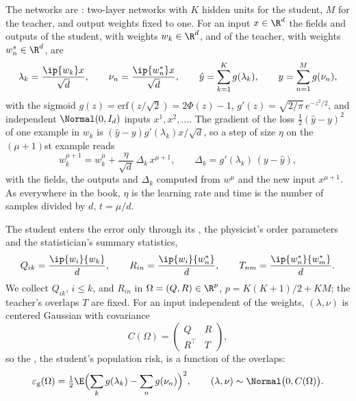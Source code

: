 \begin{refsection}
The networks are : two-layer networks with $K$ hidden units for the student, $M$ for the teacher, and output weights fixed to one. For an input $x\in\R^d$ the fields and outputs of the student, with weights $w_k\in\R^d$, and of the teacher, with weights $w^*_n\in\R^d$, are
\[
\lambda_k=\frac{\ip{w_k}x}{\sqrt d},\qquad\nu_n=\frac{\ip{w^*_n}x}{\sqrt d},\qquad\hat y=\sum_{k=1}^Kg(\lambda_k),\qquad y=\sum_{n=1}^Mg(\nu_n),
\]
with the sigmoid $g(z)=\mathrm{erf}(z/\sqrt2)=2\Phi(z)-1$, $g'(z)=\sqrt{2/\pi}\,e^{-z^2/2}$, and independent $\Normal(0,I_d)$ inputs $x^1,x^2,\dots$. The gradient of the loss $\frac12(\hat y-y)^2$ of one example in $w_k$ is $(\hat y-y)g'(\lambda_k)x/\sqrt d$, so a step of size $\eta$ on the $(\mu+1)$st example reads
\begin{equation}\label{eq:sgd:step}
w_k^{\mu+1}=w_k^\mu+\frac\eta{\sqrt d}\,\Delta_k\,x^{\mu+1},\qquad\Delta_k=g'(\lambda_k)\,(y-\hat y),
\end{equation}
with the fields, the outputs and $\Delta_k$ computed from $w^\mu$ and the new input $x^{\mu+1}$. As everywhere in the book, $\eta$ is the learning rate and time is the number of samples divided by $d$, $t=\mu/d$.

The student enters the error only through its , the physicist's order parameters and the statistician's summary statistics,
\[
Q_{ik}=\frac{\ip{w_i}{w_k}}d,\qquad R_{in}=\frac{\ip{w_i}{w^*_n}}d,\qquad T_{nm}=\frac{\ip{w^*_n}{w^*_m}}d.
\]
We collect $Q_{ik}$, $i\le k$, and $R_{in}$ in $\Omega=(Q,R)\in\R^p$, $p=K(K+1)/2+KM$; the teacher's overlaps $T$ are fixed. For an input independent of the weights, $(\lambda,\nu)$ is centered Gaussian with covariance
\begin{equation}\label{eq:sgd:cov}
C(\Omega)=\begin{pmatrix}Q&R\\R^\top&T\end{pmatrix},
\end{equation}
so the , the student's population risk, is a function of the overlaps:
\[
\sgdeg(\Omega)=\tfrac12\E\Bigl(\sum_kg(\lambda_k)-\sum_ng(\nu_n)\Bigr)^2,\qquad(\lambda,\nu)\sim\Normal\bigl(0,C(\Omega)\bigr).
\]


\end{refsection}

